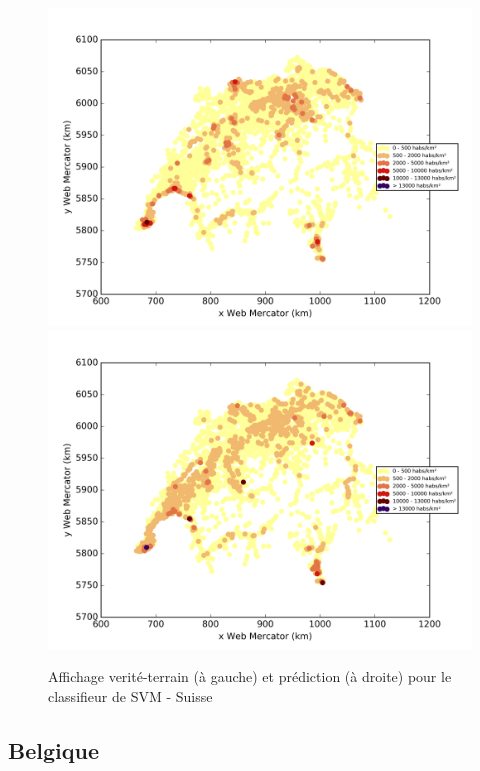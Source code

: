 \documentclass{book}
\begin{document}
\begin{figure}[H]
\centerline{
\includegraphics[scale=0.5]{../../data/Suisse/test/Support_Vector_Gaussian_Classification/Support_Vector_Gaussian_Classification/density_ground_truth.png}
\includegraphics[scale=0.5]{../../data/Suisse/test/Support_Vector_Gaussian_Classification/Support_Vector_Gaussian_Classification/density_classification.png}
}
\caption{Affichage verité-terrain (à gauche) et prédiction (à droite) pour le classifieur de SVM - Suisse}
\label{svm_carte_suisse}
\end{figure}

\subsection{Belgique}
\end{document}
